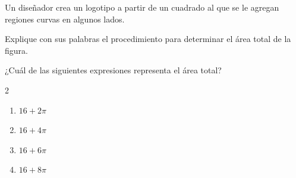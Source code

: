 Un diseñador crea un logotipo a partir de un cuadrado al que se le agregan regiones curvas en algunos lados.

Explique con sus palabras el procedimiento para determinar el área total de la figura.

¿Cuál de las siguientes expresiones representa el área total?

\begin{multicols}{2}
\begin{enumerate}[label=\alph*), leftmargin=*]
\item $16 + 2\pi$
\item $16 + 4\pi$
\item $16 + 6\pi$
\item $16 + 8\pi$
\end{enumerate}
\end{multicols}